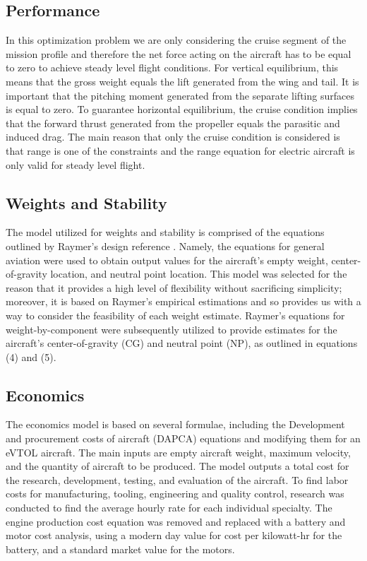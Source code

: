 \documentclass[conf]{new-aiaa}
\begin{document}
\subsection{Performance}
In this optimization problem we are only considering the cruise segment of the mission profile and therefore the net force acting on the aircraft has to be equal to zero to achieve steady level flight conditions. For vertical equilibrium, this means that the gross weight equals the lift generated from the wing and tail. It is important that the pitching moment generated from the separate lifting surfaces is equal to zero. To guarantee horizontal equilibrium, the cruise condition implies that the forward thrust generated from the propeller equals the parasitic and induced drag. The main reason that only the cruise condition is considered is that range is one of the constraints and the range equation for electric aircraft is only valid for steady level flight.

\subsection{Weights and Stability}
The model utilized for weights and stability is comprised of the equations outlined by Raymer's design reference \cite{raymer}. Namely, the equations for general aviation were used to obtain output values for the aircraft's empty weight, center-of-gravity location, and neutral point location. This model was selected for the reason that it provides a high level of flexibility without sacrificing simplicity; moreover, it is based on Raymer’s empirical estimations and so provides us with a way to consider the feasibility of each weight estimate. Raymer’s equations for weight-by-component were subsequently utilized to provide estimates for the aircraft’s center-of-gravity (CG) and neutral point (NP), as outlined in equations (4) and (5).

\subsection{Economics}
The economics model is based on several formulae, including the Development and procurement costs of aircraft (DAPCA) equations and modifying them for an eVTOL aircraft. The main inputs are empty aircraft weight, maximum velocity, and the quantity of aircraft to be produced. The model outputs a total cost for the research, development, testing, and evaluation of the aircraft. To find labor costs for manufacturing, tooling, engineering and quality control, research was conducted to find the average hourly rate for each individual specialty. The engine production cost equation was removed and replaced with a battery and motor cost analysis, using a modern day value for cost per kilowatt-hr for the battery, and a standard market value for the motors.
\end{document}
